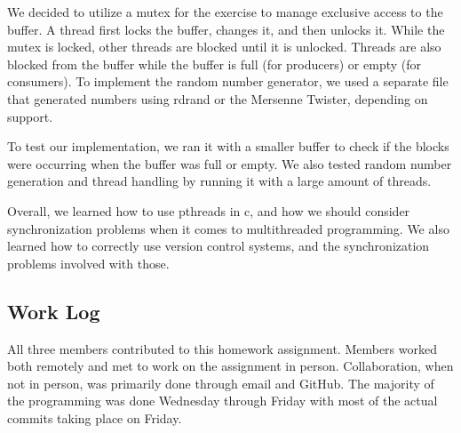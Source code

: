 \documentclass[journal, letterpaper, draftclsnofoot, onecolumn, 10pt]{IEEEtran}
\begin{document}
We decided to utilize a mutex for the exercise to manage exclusive access to the buffer. A thread first locks the buffer, changes it,
and then unlocks it. While the mutex is locked, other threads are blocked until it is unlocked. Threads are also blocked from the buffer
while the buffer is full (for producers) or empty (for consumers). To implement the random number generator, we used a separate file that
generated numbers using rdrand or the Mersenne Twister, depending on support.

To test our implementation, we ran it with a smaller buffer to check if the blocks were occurring when the buffer was full or empty.
We also tested random number generation and thread handling by running it with a large amount of threads.

Overall, we learned how to use pthreads in c, and how we should consider synchronization problems when it comes to multithreaded programming.
We also learned how to correctly use version control systems, and the synchronization problems involved with those.

\subsection{Work Log}
All three members contributed to this homework assignment.
Members worked both remotely and met to work on the assignment in person.
Collaboration, when not in person, was primarily done through email and GitHub.
The majority of the programming was done Wednesday through Friday with most of the actual commits taking place on Friday.
\clearpage
\end{document}
